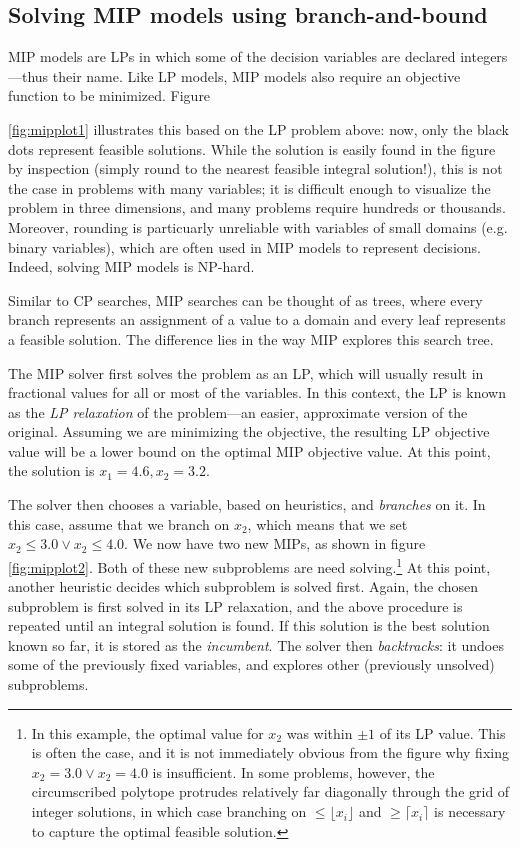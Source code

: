 \documentclass[13pt, letterpaper, oneside]{book}
\begin{document}
\subsection{Solving MIP models using branch-and-bound}
MIP models are LPs in which some of the decision variables are declared
integers---thus their name.  Like LP models, MIP models also require an
objective function to be minimized. Figure

\ref{fig:mipplot1} illustrates this based on the LP problem above: now, only the
black dots represent feasible solutions. While the solution is easily found in
the figure by inspection (simply round to the nearest feasible integral
solution!), this is not the case in problems with many variables; it is
difficult enough to visualize the problem in three dimensions, and many problems
require hundreds or thousands. Moreover, rounding is particuarly unreliable 
with variables of small domains (e.g. binary variables), which are often used in
MIP models to represent decisions. Indeed, solving MIP models is NP-hard.

Similar to CP searches, MIP searches can be thought of as trees, where every
branch represents an assignment of a value to a domain and every leaf represents
a feasible solution. The difference lies in the way MIP explores this search tree.

The MIP solver first solves the problem as an LP, which will usually result in
fractional values for all or most of the variables. In this context, the LP is
known as the \textit{LP relaxation} of the problem---an easier, approximate
version of the original. Assuming we are minimizing the objective, the resulting
LP objective value will be a lower bound on the optimal MIP objective value.
At this point, the solution is $x_1 = 4.6, x_2 = 3.2$.

The solver then chooses a variable, based on heuristics, and \textit{branches}
on it. In this case, assume that we branch on $x_2$, which means that we set
$x_2 \leq 3.0 \lor x_2 \leq 4.0$. We now have two new MIPs, as shown in figure
\ref{fig:mipplot2}. Both of these new subproblems are need solving.\footnote{In
this example, the optimal value for $x_2$ was
within $\pm1$ of its LP value.  This is often the case, and it is not
immediately obvious from the figure why fixing $x_2 = 3.0 \lor x_2 = 4.0$ is
insufficient. In some problems, however, the circumscribed polytope protrudes
relatively far diagonally through the grid of integer solutions, in which case
branching on $\leq \lfloor x_i \rfloor$ and $\geq \lceil x_i \rceil$ is
necessary to capture the optimal feasible solution.} At
this point, another heuristic decides which subproblem is solved first.
Again, the chosen subproblem is first solved in its LP relaxation, and the above
procedure is repeated until an integral solution is found. If this solution is
the best solution known so far, it is stored as the \textit{incumbent}. The
solver then \textit{backtracks}: it undoes some of the previously fixed variables,
and explores other (previously unsolved) subproblems.
\end{document}
